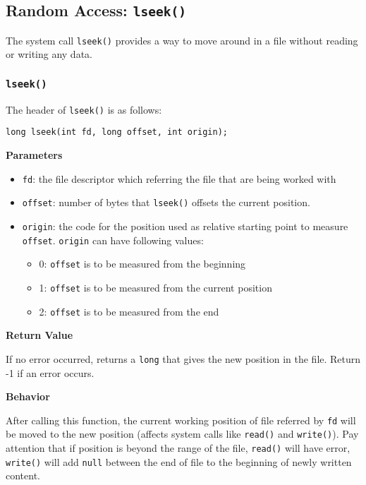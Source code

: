 \documentclass[11pt]{article}
\begin{document}
\subsection{Random Access: \texttt{lseek()}}
\label{sec:orgb9aea0a}
The system call \texttt{lseek()} provides a way to move around in a file without reading or writing any data.
\subsubsection{\texttt{lseek()}}
\label{sec:org71f4bc4}
The header of \texttt{lseek()} is as follows:
\begin{verbatim}
long lseek(int fd, long offset, int origin);
\end{verbatim}

\textbf{Parameters}

\begin{itemize}
\item \texttt{fd}: the file descriptor which referring the file that are being worked with
\item \texttt{offset}: number of bytes that \texttt{lseek()} offsets the current position.
\item \texttt{origin}: the code for the position used as relative starting point to measure \texttt{offset}. \texttt{origin} can have following values:
\begin{itemize}
\item 0: \texttt{offset} is to be measured from the beginning
\item 1: \texttt{offset} is to be measured from the current position
\item 2: \texttt{offset} is to be measured from the end
\end{itemize}
\end{itemize}

\textbf{Return Value}

If no error occurred, returns a \texttt{long} that gives the new position in the file. Return -1 if an error occurs.

\textbf{Behavior}

After calling this function, the current working position of file referred by \texttt{fd} will be moved to the new position (affects system calls like \texttt{read()} and \texttt{write()}). Pay attention that if position is beyond the range of the file, \texttt{read()} will have error, \texttt{write()} will add \texttt{null} between the end of file to the beginning of newly written content.
\end{document}
